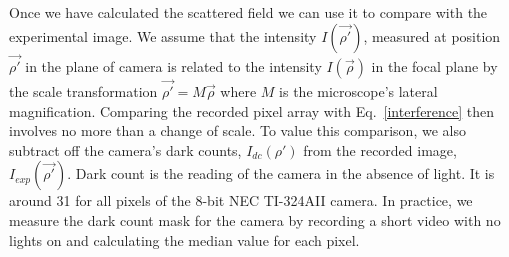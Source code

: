Once we have calculated the scattered field we can use it to compare with the experimental image. 
We assume that the intensity $I(\vec{\rho'})$, measured at position $\vec{\rho'}$ in the plane of camera is related to the intensity $I(\vec{\rho})$ in the focal plane by the scale transformation $\vec{\rho'} = M \vec{\rho}$ where $M$ is the microscope's lateral magnification. Comparing the recorded pixel array with Eq.~\ref{interference} then involves no more than a change of scale.
To value this comparison, we also subtract off the camera's dark counts, $I_{dc} (\rho')$ from the recorded image, $I_{exp} (\vec{\rho'})$. Dark count is the reading of the camera in the absence of light. It is around 31 for all pixels of the 8-bit NEC TI-324AII camera. In practice, we measure the dark count mask for the camera by recording a short video with no lights on and calculating the median value for each pixel. 

